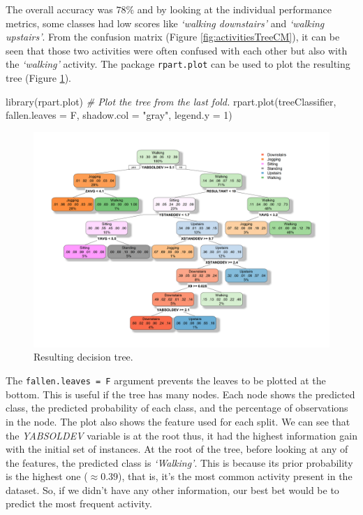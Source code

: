 \documentclass[
  11pt,
]{krantz}
\newenvironment{Shaded}{\begin{snugshade}}{\end{snugshade}}
\newcommand{\AttributeTok}[1]{\textcolor[rgb]{0.61,0.61,0.61}{#1}}
\newcommand{\CommentTok}[1]{\textcolor[rgb]{0.37,0.37,0.37}{\textit{#1}}}
\newcommand{\DecValTok}[1]{\textcolor[rgb]{0.06,0.06,0.06}{#1}}
\newcommand{\FunctionTok}[1]{\textcolor[rgb]{0,0,0}{#1}}
\newcommand{\NormalTok}[1]{#1}
\newcommand{\StringTok}[1]{\textcolor[rgb]{0.5,0.5,0.5}{#1}}
\begin{document}
The overall accuracy was \(78\%\) and by looking at the individual performance metrics, some classes had low scores like \emph{`walking downstairs'} and \emph{`walking upstairs'}. From the confusion matrix (Figure \ref{fig:activitiesTreeCM}), it can be seen that those two activities were often confused with each other but also with the \emph{`walking'} activity. The package \texttt{rpart.plot} \citep{rpartplot} can be used to plot the resulting tree (Figure \ref{fig:activitiesTree}).

\begin{Shaded}
\begin{Highlighting}[]
\FunctionTok{library}\NormalTok{(rpart.plot)}
\CommentTok{\# Plot the tree from the last fold.}
\FunctionTok{rpart.plot}\NormalTok{(treeClassifier, }\AttributeTok{fallen.leaves =}\NormalTok{ F,}
           \AttributeTok{shadow.col =} \StringTok{"gray"}\NormalTok{, }\AttributeTok{legend.y =} \DecValTok{1}\NormalTok{)}
\end{Highlighting}
\end{Shaded}

\begin{figure}

{\centering \includegraphics[width=1\linewidth]{images/activitiesTree} 

}

\caption{Resulting decision tree.}\label{fig:activitiesTree}
\end{figure}

The \texttt{fallen.leaves\ =\ F} argument prevents the leaves to be plotted at the bottom. This is useful if the tree has many nodes. Each node shows the predicted class, the predicted probability of each class, and the percentage of observations in the node. The plot also shows the feature used for each split. We can see that the \emph{YABSOLDEV} variable is at the root thus, it had the highest information gain with the initial set of instances. At the root of the tree, before looking at any of the features, the predicted class is \emph{`Walking'}. This is because its prior probability is the highest one (\(\approx 0.39\)), that is, it's the most common activity present in the dataset. So, if we didn't have any other information, our best bet would be to predict the most frequent activity.
\end{document}

